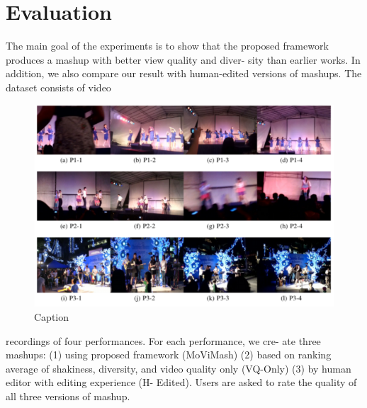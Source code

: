 \documentclass{sig-alternate}
\begin{document}
\section{Evaluation}
The main goal of the experiments is to show that the proposed
framework produces a mashup with better view quality and diver-
sity than earlier works. In addition, we also compare our result with
human-edited versions of mashups. The dataset consists of video
\begin{figure}
    \centering
    \includegraphics{img6.png}
    \caption{Caption}
    \label{fig:my_label}
\end{figure}
recordings of four performances. For each performance, we cre-
ate three mashups: (1) using proposed framework (MoViMash) (2)
based on ranking average of shakiness, diversity, and video quality
only (VQ-Only) (3) by human editor with editing experience (H-
Edited). Users are asked to rate the quality of all three versions of
mashup.




\end{document}
